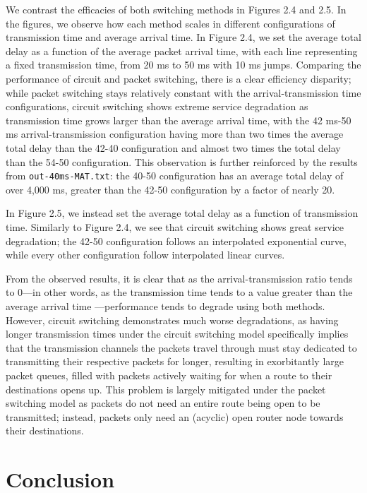 \documentclass{article}
\begin{document}
  We contrast the efficacies of both switching methods in Figures 2.4 and 2.5. In the figures, we
  observe how each method scales in different configurations of transmission time and average
  arrival time. In Figure 2.4, we set the average total delay as a function of the average packet
  arrival time, with each line representing a fixed transmission time, from 20 ms to 50 ms with 10 ms jumps. Comparing the performance of circuit and packet switching, there is a clear efficiency
  disparity; while packet switching stays relatively constant with the arrival-transmission
  time configurations, circuit switching shows extreme service degradation as transmission time
  grows larger than the average arrival time, with the 42 ms-50 ms arrival-transmission
  configuration having more than two times the average total delay than the 42-40 configuration
  and almost two times the total delay than the 54-50 configuration. This observation is further
  reinforced by the results from \verb|out-40ms-MAT.txt|: the 40-50 configuration has an average
  total delay of over 4,000 ms, greater than the 42-50 configuration by a factor of nearly 20.

  In Figure 2.5, we instead set the average total delay as a function of transmission time.
  Similarly to Figure 2.4, we see that circuit switching shows great service degradation;
  the 42-50 configuration follows an interpolated exponential curve, while every other
  configuration follow interpolated linear curves.

  From the observed results, it is clear that as the arrival-transmission ratio tends to 0---in
  other words, as the transmission time tends to a value greater than the average arrival time
  ---performance tends to degrade using both methods. However, circuit switching demonstrates much
  worse degradations, as having longer transmission times under the circuit switching model
  specifically implies that the transmission channels the packets travel through must stay
  dedicated to transmitting their respective packets for longer, resulting in exorbitantly large
  packet queues, filled with packets actively waiting for when a route to their destinations
  opens up. This problem is largely mitigated under the packet switching model as packets do not
  need an entire route being open to be transmitted; instead, packets only need an (acyclic) open
  router node towards their destinations.

  \section{Conclusion}
\end{document}
